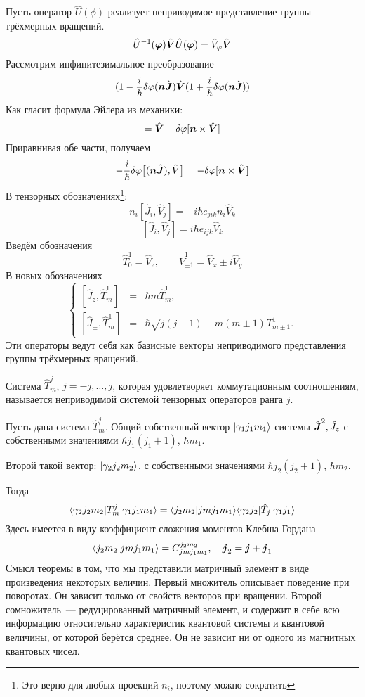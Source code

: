 Пусть оператор $\hat U(\phi)$ реализует неприводимое представление группы трёхмерных вращений.
$$
    \hat U^{-1}(\bf\phi) \hat{\bf V} \hat U (\bf \phi) = \hat V_{\phi} \hat{\bf V}
$$
Рассмотрим инфинитезимальное преобразование
$$
    (1 - \dfrac{i}{\hbar} \dta \phi (\bf n \hat{\bf J}) \hat{\bf V} (1 + \dfrac{i}{\hbar} \dta \phi(\bf n \hat{\bf J}))
$$
Как гласит формула Эйлера из механики:
$$
    = \hat{\bf V} - \dta \phi [\bf n \times \hat{\bf V}]
$$
Приравнивая обе части, получаем
$$
    -\dfrac{i}{\hbar} \dta \phi \big[
        (\bf n \hat {\bf J}), \hat V
    \big] = - \dta \phi [\bf n \times \hat{\bf V}]
$$
В тензорных обозначениях\footnote{Это верно для любых проекций $n_i$, поэтому можно сократить}:
$$
    n_i [\hat J_i, \hat V_j] = - i \hbar e_{jik} n_i \hat V_k
$$
$$
    [\hat J_i, \hat V_j] = i \hbar e_{ijk} \hat V_k
$$
Введём обозначения
$$
    \hat T_0^1 = \hat V_z, \qquad \hat V_{\pm 1}^{1} = \hat V_x \pm i \hat V_y
$$
В новых обозначениях
$$
\left\{
  \begin{array}{lcl}
    [\hat J_z, \hat T_m^1] & = & \hbar m \hat T_m^1 ,\\{}
    [\hat J_{\pm}, \hat T_m^1] & = & \hbar \sqrt{j(j+1) - m(m\pm 1)} T_{m \pm 1}^{1}.
  \end{array}
\right.
$$
Эти операторы ведут себя как базисные векторы неприводимого представления группы трёхмерных вращений.

Система $\hat T_m^j$, $j = -j, \ldots, j$, которая удовлетворяет коммутационным соотношениям, называется неприводимой системой тензорных операторов ранга $j$.

\Th Пусть дана система $\hat T_m^j$. Общий собственный вектор $\qu{\gamma_1 j_1 m_1}$ системы $\hat {\bf J}^2, \hat J_z$ с собственными значениями $\hbar j_1 (j_1 + 1)$, $\hbar m_1$.

Второй такой вектор: $\qu{\gamma_2 j_2 m_2}$, с собственными значениями $\hbar j_2 (j_2 + 1)$, $\hbar m_2$.

Тогда
$$
    \qtri{\gamma_2 j_2 m_2}{T_m^j}{\gamma_1 j_1 m_1} = \qs
    {j_2 m_2}{jm j_1 m_1} \qtri{\gamma_2 j_2}{\hat T_j}{\gamma_1 j_1}
$$
Здесь имеется в виду коэффициент сложения моментов Клебша-Гордана
$$
    \qs{j_2m_2}{jm j_1 m_1} = C_{jm j_1m_1}^{j_2m_2}, \quad \bf j_2 = \bf j + \bf j_1
$$
Смысл теоремы в том, что мы представили матричный элемент в виде произведения некоторых величин. Первый множитель описывает поведение при поворотах. Он зависит только от свойств векторов при вращении. Второй сомножитель~--- редуцированный матричный элемент, и содержит в себе всю информацию относительно характеристик квантовой системы и квантовой величины, от которой берётся среднее. Он не зависит ни от одного из магнитных квантовых чисел.


